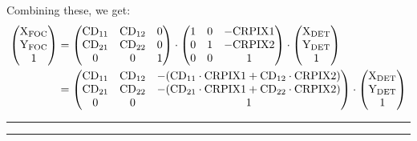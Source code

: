 \documentclass{article}
\begin{document}
Combining these, we get:
\begin{align}
   \begin{pmatrix}
      \mathrm{X}_{\mathrm{FOC}} \\
      \mathrm{Y}_{\mathrm{FOC}} \\
      1
   \end{pmatrix}
   &=
   \begin{pmatrix}
      \mathrm{CD}_{11} & \mathrm{CD}_{12} & 0 \\
      \mathrm{CD}_{21} & \mathrm{CD}_{22} & 0 \\
         0     &    0     & 1
   \end{pmatrix}
   \cdot
   \begin{pmatrix}
      1 & 0 & -\mathrm{CRPIX1} \\
      0 & 1 & -\mathrm{CRPIX2} \\
      0 & 0 & 1
   \end{pmatrix}
   \cdot
   \begin{pmatrix}
      \mathrm{X}_{\mathrm{DET}} \\
      \mathrm{Y}_{\mathrm{DET}} \\
      1
   \end{pmatrix} \\
   &=
   \begin{pmatrix}
      \mathrm{CD}_{11} & \mathrm{CD}_{12} & -(\mathrm{CD}_{11} \cdot \mathrm{CRPIX1} + \mathrm{CD}_{12} \cdot \mathrm{CRPIX2}) \\
      \mathrm{CD}_{21} & \mathrm{CD}_{22} & -(\mathrm{CD}_{21} \cdot \mathrm{CRPIX1} + \mathrm{CD}_{22} \cdot \mathrm{CRPIX2}) \\
         0     &    0     & 1
   \end{pmatrix}
   \cdot
   \begin{pmatrix}
      \mathrm{X}_{\mathrm{DET}} \\
      \mathrm{Y}_{\mathrm{DET}} \\
      1
   \end{pmatrix}
\end{align}


\hrule
\vspace{2mm}
\hrule
\vspace{5mm}

\pagebreak
\end{document}
